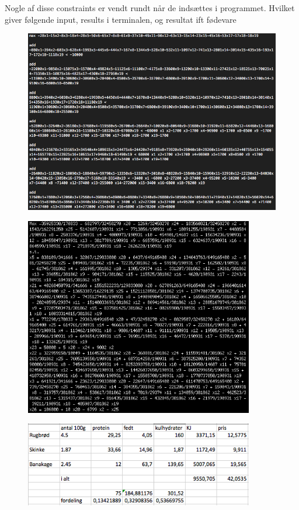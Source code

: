 \documentclass[paper=a4, fontsize=11pt]{scrartcl} %
\begin{document}
	Nogle af disse constraints er vendt rundt når de indsættes i programmet.
	Hvilket giver følgende input, results i terminalen, og resultat ift fødevare

	\begin{figure}
		\centering
		\includegraphics[width=\textwidth]{table.png}
	\end{figure}

	
	\begin{figure}
		\centering
		\includegraphics[width=10cm]{result.png}
	\end{figure}
	
	\begin{figure}
		\centering
		\includegraphics[width=10cm]{solution.png}
	\end{figure}
\end{document}
